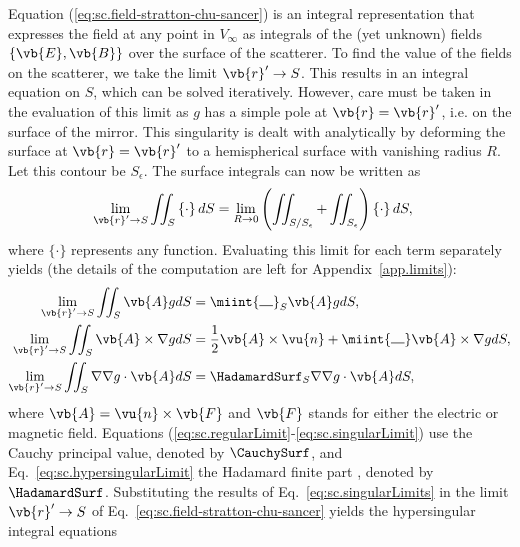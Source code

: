 \documentclass[11pt,SymmetricalJury]{inrsthesis/inrsthesis}
\begin{document}
Equation (\ref{eq:sc.field-stratton-chu-sancer}) is an integral representation
that expresses the field at any point in $V_\infty$ as integrals of the (yet unknown)
fields $\{\vb{E},\vb{B}\}$ over the surface of the scatterer.
To find the value of the fields on the scatterer, we take the limit $\vb{r}'\rightarrow S$.
This results in an integral equation on $S$, which can be solved iteratively. However,
care must be taken in the evaluation of this limit as $g$ has a simple pole at $\vb{r}=\vb{r}'$,
i.e. on the surface of the mirror.
This singularity is dealt with analytically by deforming the surface at $\vb{r}=\vb{r}'$
to a hemispherical surface with vanishing radius $R$. Let this contour be $S_\epsilon$. The
surface integrals can now be written as
  \begin{align}
    \lim_{\vb{r}'\rightarrow S}\iint_S \left\{\cdot\right\} dS
        &= \lim_{R\rightarrow0}\left(\iint_{S/S_\epsilon}+\iint_{S_\epsilon}\right) \left\{\cdot\right\}dS,
  \end{align}
where $\{\cdot\}$ represents any function. Evaluating this limit for each term separately
yields (the details of the computation are left for Appendix~\ref{app.limits}):
  \begin{subequations}
  \label{eq:sc.singularLimits}
  \begin{align}
    \lim_{\vb{r}'\rightarrow S}\iint_S \vb{A}g dS &= \miint{\rule{1em}{0.5pt}}_S \vb{A}g dS\label{eq:sc.regularLimit}, \\
    \lim_{\vb{r}'\rightarrow S}\iint_S \vb{A}\times\nabla gdS &= \frac{1}{2}\vb{A}\times\vu{n} + \miint{\rule{1em}{0.5pt}} \vb{A}\times\nabla gdS,\label{eq:sc.singularLimit}\\
    \lim_{\vb{r}'\rightarrow S}\iint_S \nabla\nabla g\cdot\vb{A}dS &= \HadamardSurf_S \nabla\nabla g \cdot\vb{A} dS\label{eq:sc.hypersingularLimit},
  \end{align}
  \end{subequations}
where $\vb{A}=\vu{n}\times\vb{F}$ and $\vb{F}$ stands for either the electric or
magnetic field. Equations (\ref{eq:sc.regularLimit}-\ref{eq:sc.singularLimit})
use the Cauchy principal value, denoted by $\CauchySurf$, and Eq.~\eqref{eq:sc.hypersingularLimit}
the Hadamard finite part \cite[Eq. (2.5)]{Blanchet2000}, denoted by $\HadamardSurf$.
Substituting the results of Eq.~\eqref{eq:sc.singularLimits} in the limit
$\vb{r}'\rightarrow S$ of Eq.~\eqref{eq:sc.field-stratton-chu-sancer}
yields the hypersingular integral equations
\end{document}

